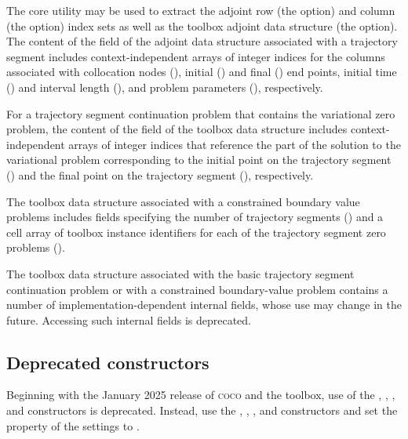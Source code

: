 The  core utility may be used to extract the adjoint row (the  option) and column (the  option) index sets as well as the toolbox adjoint data structure (the  option). The content of the  field of the adjoint data structure associated with a trajectory segment includes context-independent arrays of integer indices for the columns associated with collocation nodes (), initial () and final () end points, initial time () and interval length (), and problem parameters (), respectively. 

For a trajectory segment continuation problem that contains the variational zero problem, the content of the  field of the toolbox data structure includes context-independent arrays of integer indices that reference the part of the solution to the variational problem corresponding to the initial point on the trajectory segment () and the final point on the trajectory segment (), respectively.

The toolbox data structure associated with a constrained boundary value problems includes fields specifying the number of trajectory segments () and a cell array of toolbox instance identifiers for each of the trajectory segment zero problems ().

The toolbox data structure associated with the basic trajectory segment continuation problem or with a constrained boundary-value problem contains a number of implementation-dependent internal fields, whose use may change in the future. Accessing such internal fields is deprecated.

\subsection{Deprecated constructors}
Beginning with the January 2025 release of \textsc{coco} and the  toolbox, use of the , , , and  constructors is deprecated. Instead, use the , , , and  constructors and set the  property of the  settings to .
